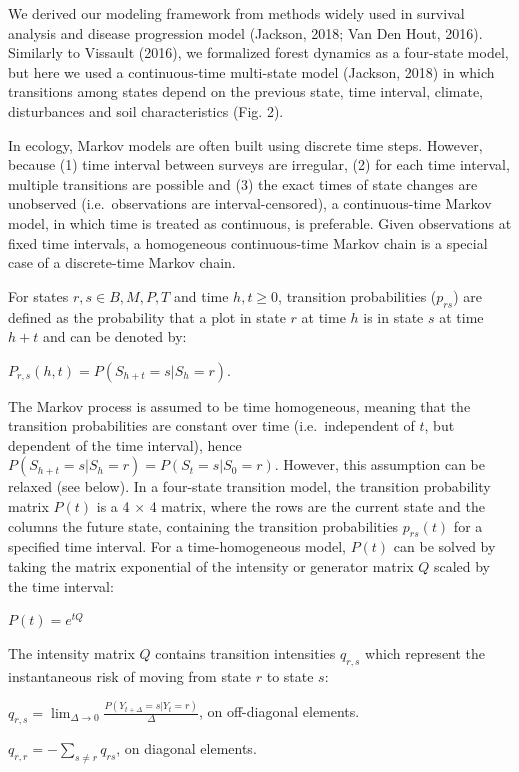 \documentclass[a4paperpaper,]{article}
\begin{document}
We derived our modeling framework from methods widely used in survival
analysis and disease progression model (Jackson, 2018; Van Den Hout,
2016). Similarly to Vissault (2016), we formalized forest dynamics as a
four-state model, but here we used a continuous-time multi-state model
(Jackson, 2018) in which transitions among states depend on the previous
state, time interval, climate, disturbances and soil characteristics
(Fig. 2).

In ecology, Markov models are often built using discrete time steps.
However, because (1) time interval between surveys are irregular, (2)
for each time interval, multiple transitions are possible and (3) the
exact times of state changes are unobserved (i.e.~observations are
interval-censored), a continuous-time Markov model, in which time is
treated as continuous, is preferable. Given observations at fixed time
intervals, a homogeneous continuous-time Markov chain is a special case
of a discrete-time Markov chain.

For states \(r,s \in {B, M, P, T}\) and time \(h,t ≥ 0\), transition
probabilities (\(p_{rs}\)) are defined as the probability that a plot in
state \(r\) at time \(h\) is in state \(s\) at time \(h + t\) and can be
denoted by:

\(P_{r,s}(h, t) = P(S_{h+t} = s | S_{h} = r)\).

The Markov process is assumed to be time homogeneous, meaning that the
transition probabilities are constant over time (i.e.~independent of
\(t\), but dependent of the time interval), hence
\(P(S_{h+t} = s | S_{h} = r) = P(S_{t} = s | S_{0} = r)\). However, this
assumption can be relaxed (see below). In a four-state transition model,
the transition probability matrix \(P(t)\) is a 4 \(\times\) 4 matrix,
where the rows are the current state and the columns the future state,
containing the transition probabilities \(p_{rs}(t)\) for a specified
time interval. For a time-homogeneous model, \(P(t)\) can be solved by
taking the matrix exponential of the intensity or generator matrix \(Q\)
scaled by the time interval:

\(P(t) = e^{tQ}\)

The intensity matrix \(Q\) contains transition intensities \(q_{r,s}\)
which represent the instantaneous risk of moving from state \(r\) to
state \(s\):

\(q_{r,s} = \lim_{\Delta \to 0} \frac{P(Y_{t+\Delta} = s | Y_t = r)}{\Delta}\),
on off-diagonal elements.

\(q_{r,r} = − \sum_{s \neq r}{q_{rs}}\), on diagonal elements.
\end{document}
